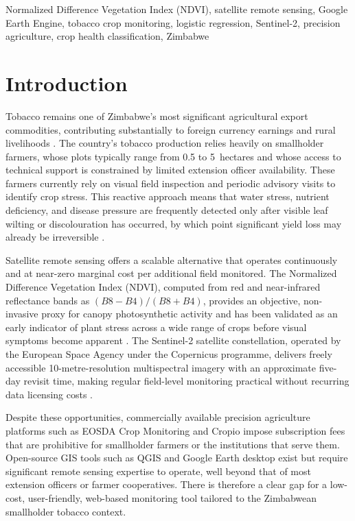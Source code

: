 \documentclass[conference]{IEEEtran}
\begin{document}
\begin{IEEEkeywords}
Normalized Difference Vegetation Index (NDVI), satellite remote sensing,
Google Earth Engine, tobacco crop monitoring, logistic regression,
Sentinel-2, precision agriculture, crop health classification, Zimbabwe
\end{IEEEkeywords}

\section{Introduction}

Tobacco remains one of Zimbabwe's most significant agricultural export
commodities, contributing substantially to foreign currency earnings and
rural livelihoods \cite{zimstats2023}. The country's tobacco production
relies heavily on smallholder farmers, whose plots typically range from
0.5 to 5~hectares and whose access to technical support is constrained
by limited extension officer availability. These farmers currently rely
on visual field inspection and periodic advisory visits to identify crop
stress. This reactive approach means that water stress, nutrient
deficiency, and disease pressure are frequently detected only after
visible leaf wilting or discolouration has occurred, by which point
significant yield loss may already be irreversible \cite{xue2017}.

Satellite remote sensing offers a scalable alternative that operates
continuously and at near-zero marginal cost per additional field
monitored. The Normalized Difference Vegetation Index (NDVI), computed
from red and near-infrared reflectance bands as $(B8 - B4)/(B8 + B4)$,
provides an objective, non-invasive proxy for canopy photosynthetic
activity and has been validated as an early indicator of plant stress
across a wide range of crops before visual symptoms become apparent
\cite{rouse1974}. The Sentinel-2 satellite constellation, operated by
the European Space Agency under the Copernicus programme, delivers freely
accessible 10-metre-resolution multispectral imagery with an approximate
five-day revisit time, making regular field-level monitoring practical
without recurring data licensing costs \cite{drusch2012}.

Despite these opportunities, commercially available precision agriculture
platforms such as EOSDA Crop Monitoring and Cropio impose subscription
fees that are prohibitive for smallholder farmers or the institutions
that serve them. Open-source GIS tools such as QGIS and Google Earth
desktop exist but require significant remote sensing expertise to
operate, well beyond that of most extension officers or farmer
cooperatives. There is therefore a clear gap for a low-cost,
user-friendly, web-based monitoring tool tailored to the Zimbabwean
smallholder tobacco context.
\end{document}
